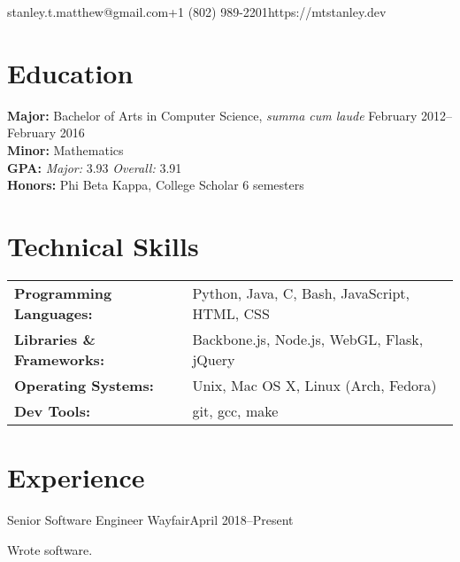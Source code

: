 \documentclass[10pt]{resume}
\begin{document}

\vspace{0.5em}
{stanley.t.matthew@gmail.com}{+1 (802) 989-2201}{https://mtstanley.dev}

\section{Education}

\textbf{Major:} Bachelor of Arts in Computer Science, \textit{summa cum laude} \hfill February 2012--February 2016\\
\textbf{Minor:} Mathematics\\
\textbf{GPA:} \textit{Major:} 3.93 \textit{Overall:} 3.91\\
\textbf{Honors:} Phi Beta Kappa, College Scholar 6 semesters

\section{Technical Skills}

\begin{tabular}{>{\bfseries}l l}
Programming Languages:  &  Python, Java, C, Bash, JavaScript, HTML, CSS \\
Libraries \& Frameworks:&  Backbone.js, Node.js, WebGL, Flask, jQuery   \\
Operating Systems:      &  Unix, Mac OS X, Linux (Arch, Fedora)         \\
Dev Tools:              &  git, gcc, make                               \\
\end{tabular}

\section{Experience}

\expblock
{Senior Software Engineer \textnormal{Wayfair}}{April 2018--Present}
{
    \item Wrote software. %
}
\end{document}
